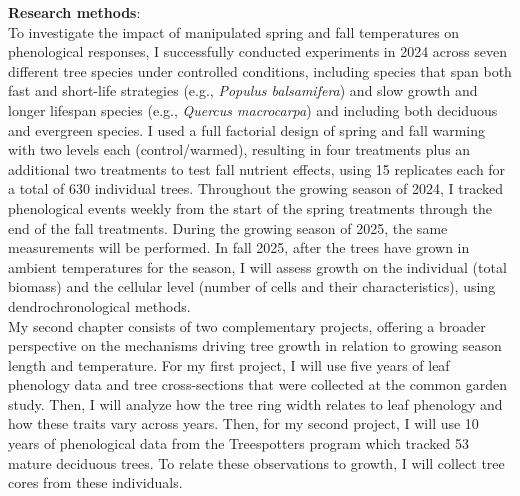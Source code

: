 \documentclass[11pt,letter]{article}
\begin{document}
\textbf{Research methods}: \\
To investigate the impact of manipulated spring and fall temperatures on phenological responses, I successfully conducted experiments in 2024 across seven different tree species under controlled conditions, including species that span both fast and short-life strategies (e.g., \textit{Populus balsamifera}) and slow growth and longer lifespan species (e.g., \textit{Quercus macrocarpa}) and including both deciduous and evergreen species. \citep{jonsson_annual_2010}  I used a full factorial design of spring and fall warming with two levels each (control/warmed), resulting in four treatments plus an additional two treatments to test fall nutrient effects, using 15 replicates each for a total of 630 individual trees. Throughout the growing season of 2024, I tracked phenological events weekly from the start of the spring treatments through the end of the fall treatments. During the growing season of 2025, the same measurements will be performed. In fall 2025, after the trees have grown in ambient temperatures for the season, I will assess growth on the individual (total biomass) and the cellular level (number of cells and their characteristics), using dendrochronological methods.\\
My second chapter consists of two complementary projects, offering a broader perspective on the mechanisms driving tree growth in relation to growing season length and temperature. For my first project, I will use five years of leaf phenology data and tree cross-sections that were collected at the common garden study. Then, I will analyze how the tree ring width relates to leaf phenology and how these traits vary across years. Then, for my second project, I will use 10 years of phenological data from the Treespotters program which tracked 53 mature deciduous trees. To relate these observations to growth, I will collect tree cores from these individuals.  
\end{document}
